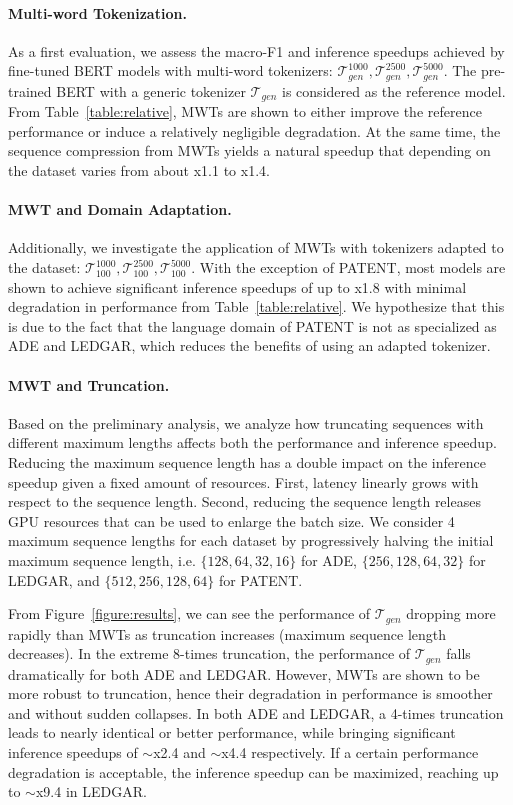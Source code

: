\documentclass[11pt]{article}
\def\tokgen{\mathcal{T}_{gen}}
\def\tok100{\mathcal{T}_{100}}
\begin{document}
\paragraph{Multi-word Tokenization.}
As a first evaluation, we assess the macro-F1 and inference speedups achieved by fine-tuned BERT models with multi-word tokenizers: $\tokgen^{1000}, \tokgen^{2500}, \tokgen^{5000}$. The pre-trained BERT with a generic tokenizer $\tokgen$ is considered as the reference model. From Table~\ref{table:relative}, MWTs are shown to either improve the reference performance or induce a relatively negligible degradation. At the same time, the sequence compression from MWTs yields a natural speedup that depending on the dataset varies from about x1.1 to x1.4.

\paragraph{MWT and Domain Adaptation.}
Additionally, we investigate the application of MWTs with tokenizers adapted to the dataset: $\tok100^{1000}, \tok100^{2500}, \tok100^{5000}$. With the exception of PATENT, most models are shown to achieve significant inference speedups of up to x1.8 with minimal degradation in performance from Table~\ref{table:relative}. We hypothesize that this is due to the fact that the language domain of PATENT is not as specialized as ADE and LEDGAR, which reduces the benefits of using an adapted tokenizer.

\paragraph{MWT and Truncation.} 
Based on the preliminary analysis, we analyze how truncating sequences with different maximum lengths affects both the performance and inference speedup. Reducing the maximum sequence length has a double impact on the inference speedup given a fixed amount of resources. First, latency linearly grows with respect to the sequence length. Second, reducing the sequence length releases GPU resources that can be used to enlarge the batch size. We consider 4 maximum sequence lengths for each dataset by progressively halving the initial maximum sequence length, i.e. $\{128,64,32,16\}$ for ADE, $\{256,128,64,32\}$ for LEDGAR, and $\{512,256,128,64\}$ for PATENT.

From Figure~\ref{figure:results}, we can see the performance of $\tokgen$ dropping more rapidly than MWTs as truncation increases (maximum sequence length decreases). In the extreme 8-times truncation, the performance of $\tokgen$ falls dramatically for both ADE and LEDGAR. However, MWTs are shown to be more robust to truncation, hence their degradation in performance is smoother and without sudden collapses. In both ADE and LEDGAR, a 4-times truncation leads to nearly identical or better performance, while bringing significant inference speedups of $\sim$x2.4 and $\sim$x4.4 respectively. If a certain performance degradation is acceptable, the inference speedup can be maximized, reaching up to $\sim$x9.4 in LEDGAR.
\end{document}

